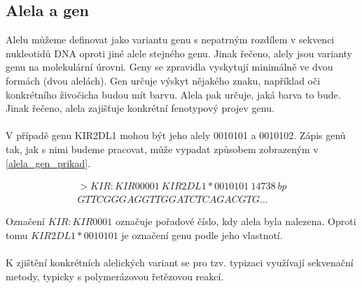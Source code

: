 \documentclass[czech,DP]{thesiskiv}
\numberwithin{equation}{section}
\begin{document}
\subsection{Alela a gen}
Alelu můžeme definovat jako variantu genu s nepatrným rozdílem v sekvenci nukleotidů DNA oproti jiné alele stejného genu. Jinak řečeno, alely jsou varianty genu na molekulární úrovni. Geny se zpravidla vyskytují minimálně ve dvou formách (dvou alelách). Gen určuje výskyt nějakého znaku, například oči konkrétního živočicha budou mít barvu. Alela pak určuje, jaká barva to bude. Jinak řečeno, alela zajišťuje konkrétní fenotypový projev genu.
\\
\\
V případě genu KIR2DL1 mohou být jeho alely 0010101 a 0010102. Zápis genů tak, jak s nimi budeme pracovat, může vypadat způsobem zobrazeným v \ref{alela_gen_prikad}. 

\begin{equation}\begin{split} 
   \label{alela_gen_prikad}
   		>KIR:KIR00001\: KIR2DL1*0010101\: 14738\: bp \\
		GTTCGGGAGGTTGGATCTCAGACGTG...
\end{split}\end{equation}

\noindent 
Označení $KIR:KIR0001$ označuje pořadové číslo, kdy alela byla nalezena. Oproti tomu $KIR2DL1*0010101$ je označení genu podle jeho vlastnotí.
\\
\\
K zjištění konkrétních alelických variant se pro tzv. typizaci využívají sekvenační metody, typicky s polymerázovou řetězovou reakcí. 
\end{document}
